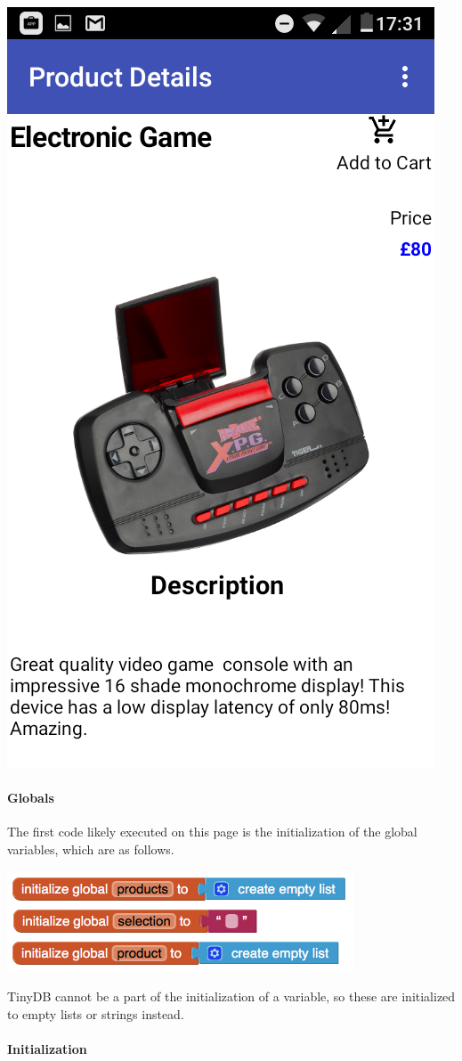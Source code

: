 \documentclass{scrreprt}
\begin{document}
\begin{center}
    \includegraphics[width=0.5\linewidth]{images/productDesign.png}
\end{center}

\paragraph{Globals}

The first code likely executed on this page is the initialization of the global variables, which are as follows.

\begin{center}
    \includegraphics[width=0.75\linewidth]{images/productVariables.png}
\end{center}

TinyDB cannot be a part of the initialization of a variable, so these are initialized to empty lists or strings instead.

\paragraph{Initialization}
\end{document}
